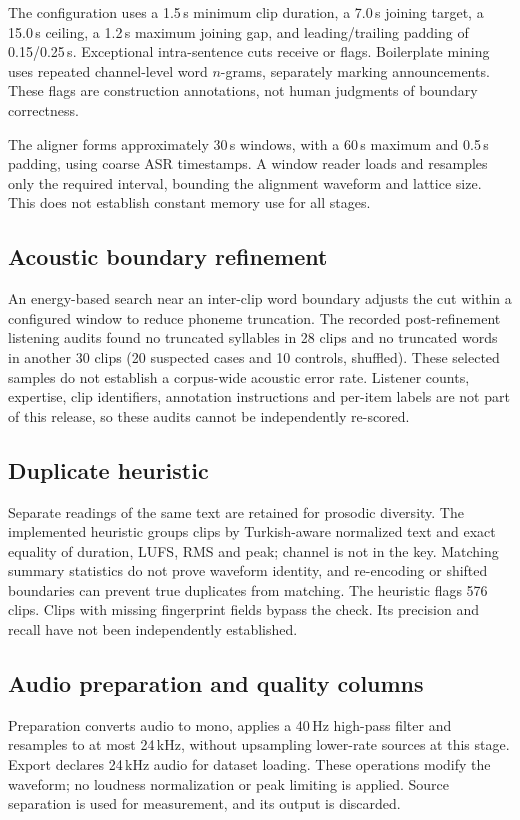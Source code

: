 \documentclass[11pt,a4paper]{article}
\begin{document}
The configuration uses a 1.5\,s minimum clip duration, a 7.0\,s joining
target, a 15.0\,s ceiling, a 1.2\,s maximum joining gap, and leading/trailing
padding of 0.15/0.25\,s. Exceptional intra-sentence cuts receive
 or  flags. Boilerplate mining uses
repeated channel-level word $n$-grams, separately marking announcements.
These flags are construction annotations, not human judgments of boundary
correctness.

The aligner forms approximately 30\,s windows, with a 60\,s maximum and
0.5\,s padding, using coarse ASR timestamps. A window reader loads and
resamples only the required interval, bounding the alignment waveform and
lattice size. This does not establish constant memory use for all stages.

\subsection{Acoustic boundary refinement}
An energy-based search near an inter-clip word boundary adjusts the cut
within a configured window to reduce phoneme truncation. The recorded
post-refinement listening audits found no truncated syllables in 28 clips
and no truncated words in another 30 clips (20 suspected cases and 10
controls, shuffled). These selected samples do not establish a corpus-wide
acoustic error rate. Listener counts, expertise, clip identifiers, annotation
instructions and per-item labels are not part of this release, so these
audits cannot be independently re-scored.

\subsection{Duplicate heuristic}
Separate readings of the same text are retained for prosodic diversity.
The implemented heuristic groups clips by Turkish-aware normalized text and
exact equality of duration, LUFS, RMS and peak; channel is not in the key.
Matching summary statistics do not prove waveform identity, and re-encoding
or shifted boundaries can prevent true duplicates from matching. The
heuristic flags 576 clips. Clips with missing fingerprint fields bypass the
check. Its precision and recall have not been independently established.

\subsection{Audio preparation and quality columns}
Preparation converts audio to mono, applies a 40\,Hz high-pass filter and
resamples to at most 24\,kHz, without upsampling lower-rate sources at this
stage. Export declares 24\,kHz audio for dataset loading. These operations
modify the waveform; no loudness normalization or peak limiting is applied.
Source separation is used for measurement, and its output is discarded.
\end{document}

